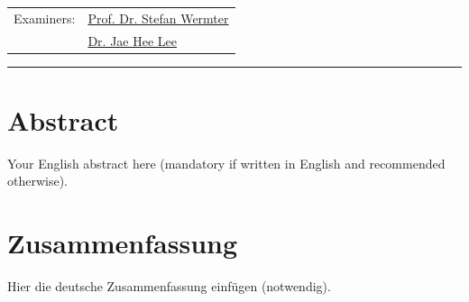 \documentclass[12pt,final,twoside]{report}
\makeatletter
\newcommand{\trauthor}{Imran Ibrahimli}
\newcommand{\trmatrikelnummer}{7486484}
\newcommand{\trgutachterA}{\href{mailto:stefan.wermter@uni-hamburg.de}{Prof. Dr. Stefan Wermter}}
\newcommand{\trgutachterB}{\href{mailto:jae.hee.lee@uni-hamburg.de}{Dr. Jae Hee Lee}}
\theoremstyle{plain}
\theoremstyle{definition}
\theoremstyle{remark}
\makeatother
\begin{document}
\begin{titlepage}
\begin{center}
  \end{center}
  \vspace{2cm}
  \begin{center}
    \begin{tabular}{ll}
      Examiners: & \trgutachterA \\
                 & \trgutachterB \\
    \end{tabular}
  \end{center}
  \vfill
  \rule{\textwidth}{0.4pt}
  \newpage
\end{titlepage}

\thispagestyle{empty}
\hspace{1cm}
\newpage

\section*{Abstract}\label{sec:abstract}
Your English abstract here (mandatory if written in English and recommended otherwise).

\vfill
\section*{Zusammenfassung}\label{sec:zusammenfassung}
Hier die deutsche Zusammenfassung einf\"ugen (notwendig).

\cleardoublepage

\tableofcontents
\cleardoublepage
\listoffigures
\cleardoublepage
{}
\listoftables
\cleardoublepage
\end{document}
